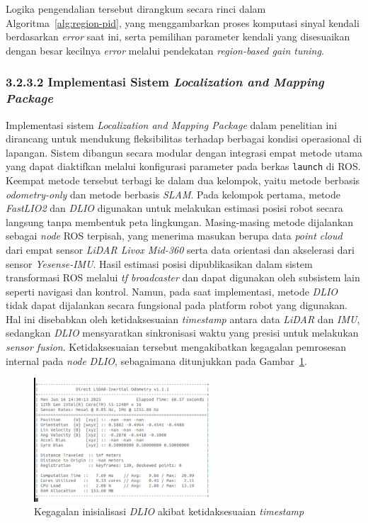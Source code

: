 Logika pengendalian tersebut dirangkum secara rinci dalam Algoritma~\ref{alg:region-pid}, yang menggambarkan proses komputasi sinyal kendali berdasarkan \emph{error} saat ini, serta pemilihan parameter kendali yang disesuaikan dengan besar kecilnya \emph{error} melalui pendekatan \emph{region-based gain tuning}.



\subsubsection{3.2.3.2 Implementasi Sistem \emph{Localization and Mapping Package}}

Implementasi sistem \emph{Localization and Mapping Package} dalam penelitian ini dirancang untuk mendukung fleksibilitas terhadap berbagai kondisi operasional di lapangan. Sistem dibangun secara modular dengan integrasi empat metode utama yang dapat diaktifkan melalui konfigurasi parameter pada berkas \texttt{launch} di ROS. Keempat metode tersebut terbagi ke dalam dua kelompok, yaitu metode berbasis \emph{odometry-only} dan metode berbasis \emph{SLAM}. Pada kelompok pertama, metode \emph{FastLIO2} dan \emph{DLIO} digunakan untuk melakukan estimasi posisi robot secara langsung tanpa membentuk peta lingkungan. Masing-masing metode dijalankan sebagai \emph{node} ROS terpisah, yang menerima masukan berupa data \emph{point cloud} dari empat sensor \emph{LiDAR Livox Mid-360} serta data orientasi dan akselerasi dari sensor \emph{Yesense-IMU}. Hasil estimasi posisi dipublikasikan dalam sistem transformasi ROS melalui \emph{tf broadcaster} dan dapat digunakan oleh subsistem lain seperti navigasi dan kontrol. Namun, pada saat implementasi, metode \emph{DLIO} tidak dapat dijalankan secara fungsional pada platform robot yang digunakan. Hal ini disebabkan oleh ketidaksesuaian \emph{timestamp} antara data \emph{LiDAR} dan \emph{IMU}, sedangkan \emph{DLIO} mensyaratkan sinkronisasi waktu yang presisi untuk melakukan \emph{sensor fusion}. Ketidaksesuaian tersebut mengakibatkan kegagalan pemrosesan internal pada \emph{node} \emph{DLIO}, sebagaimana ditunjukkan pada Gambar~\ref{fig:dlio-error}.

\begin{figure}[H]
  \centering
  \includegraphics[width=0.6\textwidth]{gambar/bab3/dlio-error-negate.png}
  \caption{Kegagalan inisialisasi \emph{DLIO} akibat ketidaksesuaian \emph{timestamp}} 
  \label{fig:dlio-error}
\end{figure}

